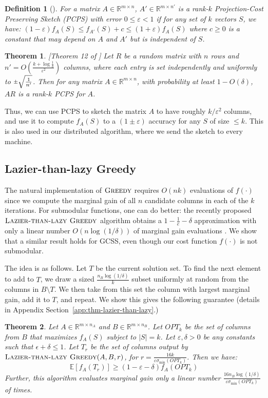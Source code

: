 \documentclass{article}
\newtheorem{defin}{Definition}\newtheorem{thm}{Theorem}\newtheorem{exe}{Exercise}\newtheorem{exa}{Example}\newtheorem{fact}{Fact}\newtheorem{prop}{Proposition}\newtheorem{lemma}{Lemma}\newtheorem{corol}{Corollary}\newtheorem{conj}{Conjecture}\newtheorem{remark}{Remark}\newtheorem{discussion}{Discussion}\newtheorem{conc}{Conclusion}
\newcommand{\Real}{\mathbb{R}}
\newcommand{\E}{\mathbb{E}}
\newcommand{\eps}{\varepsilon}
\newcommand{\plusminus}{\raisebox{.2ex}{$\scriptstyle\pm$}}
\newcommand{\greedy}{\textsc{Greedy}}
\newcommand{\ltlgreedy}{\textsc{Lazier-than-lazy Greedy}}
\newcommand{\gcss}{\textsf{GCSS}}
\begin{document}
\begin{defin}[\cite{Cohen}] \label{defin:pcps} For a matrix $A \in \Real^{m \times n}$, 
$A' \in \Real^{m \times n'}$ is a \emph{rank-$k$ Projection-Cost Preserving Sketch (PCPS)} with error $0 \leq \eps < 1$ if for any set of $k$ vectors $S$, we have: $(1 - \eps) f_A(S) \leq f_{A'}(S) + c \leq (1 + \eps) f_A(S)$
where $c \geq 0$ is a constant that may depend on $A$ and $A'$ but is independent of $S$.
\end{defin}

\begin{thm}\label{thm:pcps}[Theorem 12 of \cite{Cohen}]
Let $R$ be a random matrix with $n$ rows and $n' = O(\frac{k + \log\frac{1}{\delta}}{\eps^2})$ columns, where each entry is set independently and uniformly to $\plusminus \sqrt{\frac{1}{n'}}$. Then for any matrix $A \in \Real^{m \times n}$, with probability at least $1 - O(\delta)$, $AR$ is a rank-$k$ PCPS for $A$.
\end{thm}

Thus, we can use PCPS to sketch the matrix $A$ to have roughly $k/\eps^2$ columns, and use it to compute $f_A(S)$ to a $(1\pm \eps)$ accuracy for any $S$ of size $\le k$.  This is also used in our distributed algorithm, where we send the sketch to every machine.

\subsection{Lazier-than-lazy Greedy}
The natural implementation of $\greedy$ requires $O(nk)$ evaluations of $f(\cdot)$ since we compute the marginal gain of all $n$ candidate columns in each of the $k$ iterations. For submodular functions, one can do better: the recently proposed $\ltlgreedy$ algorithm obtains a  $1 - \frac{1}{e} - \delta$ approximation with only a linear number $O(n \log (1/\delta))$ of marginal gain evaluations \cite{Mirzasoleiman}. We show that a similar result holds for \gcss, even though our cost function $f(\cdot)$ is not submodular. 

The idea is as follows. Let $T$ be the current solution set. To find the next element to add to $T$, we draw a sized $\frac{n_B \log (1/\delta)}{k} $ subset uniformly at random from the columns in $B \setminus T$. We then take from this set the column with largest marginal gain, add it to $T$, and repeat. We show this gives the following guarantee (details in Appendix Section~\ref{app:thm-lazier-than-lazy}.)

\begin{thm} \label{thm-lazier-than-lazy:main}
Let $A\in \Real^{m \times n_A}$ and $B \in \Real^{m \times n_B}$. Let $OPT_k$ be the set of columns from $B$ that maximizes $f_A(S)$ subject to $|S| = k$. Let $\eps, \delta > 0$ be any constants such that $\epsilon + \delta \leq 1$. Let $T_r$ be the set of columns output by $\ltlgreedy (A, B, r)$, for $r = \frac{16k}{\eps \sigma_{\min}(OPT_k)}$. Then we have:
$$\E[f_A(T_r)] \geq (1 - \eps - \delta) f_A(OPT_k)$$
Further, this algorithm evaluates marginal gain only a linear number $\frac{16n_B \log (1/\delta)}{\eps \sigma_{\min}(OPT_k)}$ of times.
\end{thm}
\end{document}
